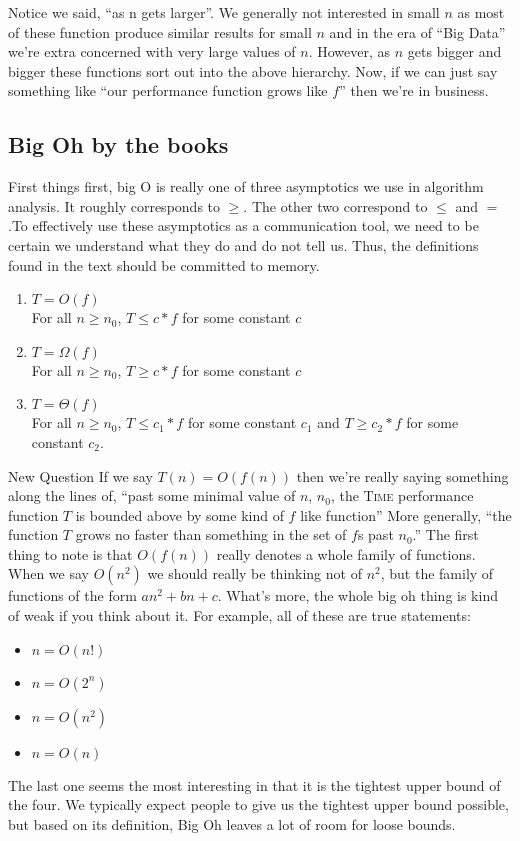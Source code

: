 \documentclass[]{tufte-handout}
\begin{document}
Notice we said, ``as n gets larger''.  We generally not interested in small $n$ as most of these function produce similar results for small $n$ and in the era of ``Big Data'' we're extra concerned with very large values of $n$. However, as $n$ gets bigger and bigger these functions sort out into the above hierarchy. Now, if we can just say something like ``our performance function grows like $f$'' then we're in business.

\subsection{Big Oh by the books}

First things first, big O is really one of three asymptotics we use in algorithm analysis. It roughly corresponds to $\geq$. The other two correspond to $\leq$ and $=$.To effectively use these asymptotics as a communication tool, we need to be certain we understand what they do and do not tell us.  Thus, the definitions found in the text should be committed to memory.

\begin{enumerate}
\item $T = O(f)$ \\
For all $n \geq n_0$, $T \leq c*f$ for some constant $c$ 
\item $T = \Omega(f)$ \\
For all $n \geq n_0$, $T \geq c*f$ for some constant $c$ 
\item $T = \Theta(f)$ \\
For all $n \geq n_0$, $T \leq c_1*f$ for some constant $c_1$ and $T \geq c_2*f$ for some constant $c_2$. 
\end{enumerate}
 

New Question
If we say $T(n) = O(f(n))$ then we're really saying something along the lines of, ``past some minimal value of $n$, $n_0$, the \textsc{Time} performance function $T$ is bounded above by some kind of $f$ like function'' More generally, ``the function $T$ grows no faster than something in the set of $f$s  past $n_0$.'' The first thing to note is that $O(f(n))$ really denotes a whole family of functions. When we say $O(n^2)$ we should really be thinking not of $n^2$, but the family of functions of the form $an^2 + bn + c$. What's more, the whole big oh thing is kind of weak if you think about it. For example, all of these are true statements:
\begin{itemize}
\item $n = O(n!)$
\item $n = O(2^n)$
\item $n = O(n^2)$
\item $n = O(n)$
\end{itemize}
The last one seems the most interesting in that it is the tightest upper bound of the four. We typically expect people to give us the tightest upper bound possible, but based on its definition, Big Oh leaves a lot of room for loose bounds. 
\end{document}
